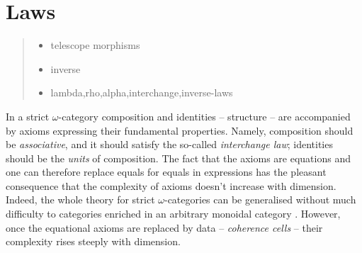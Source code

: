 \section{Laws}
\label{sec:laws}

\begin{quote}
  \begin{itemize}
  \item telescope morphisms
  \item inverse
  \item lambda,rho,alpha,interchange,inverse-laws
  \end{itemize}
\end{quote}

%
In a strict $\omega$-category composition and
identities -- structure -- are accompanied by axioms expressing their fundamental
properties. Namely, composition should be \emph{associative}, and it
should satisfy the so-called \emph{interchange law}; identities should
be the \emph{units} of composition. The fact that the axioms are
equations and one can therefore replace equals for equals in
expressions has the pleasant consequence that the
complexity of axioms doesn't increase with dimension. Indeed, the whole theory
for strict $\omega$-categories can be generalised without much difficulty
to categories enriched in an arbitrary monoidal
category \cite{kelly:1982}. However, once 
the equational axioms are replaced by data -- \emph{coherence cells} -- their
complexity rises steeply with dimension. 

